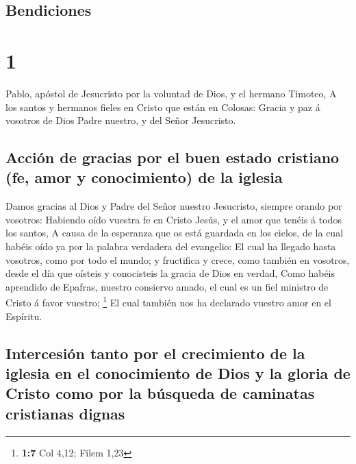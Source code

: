 \hypertarget{bendiciones}{%
\subsection{Bendiciones}\label{bendiciones}}

\hypertarget{section}{%
\section{1}\label{section}}

 Pablo, apóstol de Jesucristo por la voluntad de Dios, y el
hermano Timoteo,  A los santos y hermanos fieles en Cristo
que están en Colosas: Gracia y paz á vosotros de Dios Padre nuestro, y
del Señor Jesucristo.

\hypertarget{acciuxf3n-de-gracias-por-el-buen-estado-cristiano-fe-amor-y-conocimiento-de-la-iglesia}{%
\subsection{Acción de gracias por el buen estado cristiano (fe, amor y
conocimiento) de la
iglesia}\label{acciuxf3n-de-gracias-por-el-buen-estado-cristiano-fe-amor-y-conocimiento-de-la-iglesia}}

 Damos gracias al Dios y Padre del Señor nuestro Jesucristo,
siempre orando por vosotros:  Habiendo oído vuestra fe en
Cristo Jesús, y el amor que tenéis á todos los santos,  A
causa de la esperanza que os está guardada en los cielos, de la cual
habéis oído ya por la palabra verdadera del evangelio:  El
cual ha llegado hasta vosotros, como por todo el mundo; y fructifica y
crece, como también en vosotros, desde el día que oísteis y conocisteis
la gracia de Dios en verdad,  Como habéis aprendido de
Epafras, nuestro consiervo amado, el cual es un fiel ministro de Cristo
á favor vuestro; \footnote{\textbf{1:7} Col 4,12; Filem 1,23}
 El cual también nos ha declarado vuestro amor en el
Espíritu.

\hypertarget{intercesiuxf3n-tanto-por-el-crecimiento-de-la-iglesia-en-el-conocimiento-de-dios-y-la-gloria-de-cristo-como-por-la-buxfasqueda-de-caminatas-cristianas-dignas}{%
\subsection{Intercesión tanto por el crecimiento de la iglesia en el
conocimiento de Dios y la gloria de Cristo como por la búsqueda de
caminatas cristianas
dignas}\label{intercesiuxf3n-tanto-por-el-crecimiento-de-la-iglesia-en-el-conocimiento-de-dios-y-la-gloria-de-cristo-como-por-la-buxfasqueda-de-caminatas-cristianas-dignas}}

